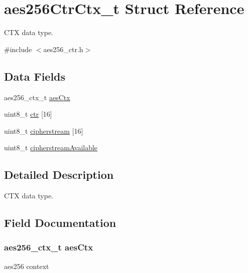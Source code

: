 \hypertarget{structaes256_ctr_ctx__t}{}\section{aes256\+Ctr\+Ctx\+\_\+t Struct Reference}
\label{structaes256_ctr_ctx__t}


C\+TX data type.  




{\ttfamily \#include $<$aes256\+\_\+ctr.\+h$>$}

\subsection*{Data Fields}
\begin{DoxyCompactItemize}
\item 
aes256\+\_\+ctx\+\_\+t \hyperlink{structaes256_ctr_ctx__t_a534622294f464c237dcab49728a897d4}{aes\+Ctx}
\item 
uint8\+\_\+t \hyperlink{structaes256_ctr_ctx__t_a5ff3a4c9ddefb040b9dabf2f939dd62a}{ctr} \mbox{[}16\mbox{]}
\item 
uint8\+\_\+t \hyperlink{structaes256_ctr_ctx__t_a0629c0a9d7eb57c8a2da94f78e1d08a4}{cipherstream} \mbox{[}16\mbox{]}
\item 
uint8\+\_\+t \hyperlink{structaes256_ctr_ctx__t_a37e06e9c77c1b2ee0bfc01d32cda6e38}{cipherstream\+Available}
\end{DoxyCompactItemize}


\subsection{Detailed Description}
C\+TX data type. 

\subsection{Field Documentation}
\subsubsection[{\texorpdfstring{aes\+Ctx}{aesCtx}}]{\setlength{\rightskip}{0pt plus 5cm}aes256\+\_\+ctx\+\_\+t aes\+Ctx}\hypertarget{structaes256_ctr_ctx__t_a534622294f464c237dcab49728a897d4}{}\label{structaes256_ctr_ctx__t_a534622294f464c237dcab49728a897d4}
aes256 context 
